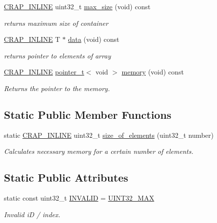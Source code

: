 \begin{DoxyCompactItemize}
\hyperlink{config__x86_8h_a5a40526b8d842e7ff731509998bb0f1c}{C\+R\+A\+P\+\_\+\+I\+N\+L\+I\+N\+E} uint32\+\_\+t \hyperlink{classcrap_1_1indexed__array_a1d6f82e3d913f90275c752e13b8f1627}{max\+\_\+size} (void) const 
\begin{DoxyCompactList}\small\item\em returns maximum size of container \end{DoxyCompactList}\item 
\hyperlink{config__x86_8h_a5a40526b8d842e7ff731509998bb0f1c}{C\+R\+A\+P\+\_\+\+I\+N\+L\+I\+N\+E} T $\ast$ \hyperlink{classcrap_1_1indexed__array_a0b98dabd34b89333da63b9f9472264e9}{data} (void) const 
\begin{DoxyCompactList}\small\item\em returns pointer to elements of array \end{DoxyCompactList}\item 
\hyperlink{config__x86_8h_a5a40526b8d842e7ff731509998bb0f1c}{C\+R\+A\+P\+\_\+\+I\+N\+L\+I\+N\+E} \hyperlink{structcrap_1_1pointer__t}{pointer\+\_\+t}$<$ void $>$ \hyperlink{classcrap_1_1indexed__array_a1529542ed308445e101e5540b7498d4e}{memory} (void) const 
\begin{DoxyCompactList}\small\item\em Returns the pointer to the memory. \end{DoxyCompactList}\end{DoxyCompactItemize}
\subsection*{Static Public Member Functions}
\begin{DoxyCompactItemize}
\item 
static \hyperlink{config__x86_8h_a5a40526b8d842e7ff731509998bb0f1c}{C\+R\+A\+P\+\_\+\+I\+N\+L\+I\+N\+E} uint32\+\_\+t \hyperlink{classcrap_1_1indexed__array_a258d01b64551591270099716ced5d3b7}{size\+\_\+of\+\_\+elements} (uint32\+\_\+t number)
\begin{DoxyCompactList}\small\item\em Calculates necessary memory for a certain number of elements. \end{DoxyCompactList}\end{DoxyCompactItemize}
\subsection*{Static Public Attributes}
\begin{DoxyCompactItemize}
\item 
static const uint32\+\_\+t \hyperlink{classcrap_1_1indexed__array_aa3ba1587d20c46f7557a7cacaf4d9cd8}{I\+N\+V\+A\+L\+I\+D} = \hyperlink{crap__types_8h_ab5eb23180f7cc12b7d6c04a8ec067fdd}{U\+I\+N\+T32\+\_\+\+M\+A\+X}
\begin{DoxyCompactList}\small\item\em Invalid i\+D / index. \end{DoxyCompactList}\end{DoxyCompactItemize}


